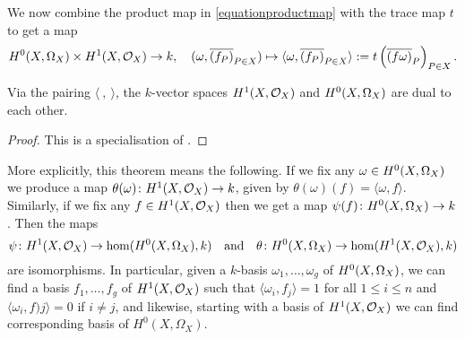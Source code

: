 We now combine the product map in \eqref{equationproductmap} with the trace map $t$ to get a map 
    \[
    {H^0(X,\Omega_X)} \times H^1(X,\mathcal{O}_X) \rightarrow k,\quad (\omega, \overline{(f_P)}_{P \in X}) \mapsto \langle \omega, \overline{(f_P)}_{P \in X} \rangle := t \left( \overline{(f \omega)}_P \right)_{P \in X}.
    \]

    \begin{thm}\label{theoremserreduality}
    Via the pairing $\langle\ ,\ \rangle$, the $k$-vector spaces $H^1(X,\mathcal{O}_X)$ and ${H^0(X,\Omega_X)}$ are dual to each other.
    \end{thm}
    \begin{proof}
    This is a specialisation of \cite[Chap.\ II, Thm.\ 2]{algebraicgroupsandclassfields}.
    \end{proof}

More explicitly, this theorem means the following.
If we fix any $\omega \in {H^0(X,\Omega_X)}$ we produce a map $\theta(\omega)\colon H^1(X,\mathcal{O}_X) \rightarrow k$, given by $\theta(\omega)(f) = \langle \omega , f\rangle$.
Similarly, if we fix any $f \in H^1(X,\mathcal{O}_X)$ then we get a map $\psi(f) \colon {H^0(X,\Omega_X)} \rightarrow k$.
Then the maps 
    \[
    \psi \colon H^1(X,\mathcal{O}_X) \rightarrow \hom(H^0(X,\Omega_X),k) \quad
    \text{and} \quad    
    \theta \colon H^0(X,\Omega_X) \rightarrow \hom(H^1(X,\mathcal{O}_X), k)
    \]
are isomorphisms.
In particular, given a $k$-basis $\omega_1, \ldots, \omega_g$ of ${H^0(X,\Omega_X)}$, we can find a basis $f_1, \ldots , f_g$ of $H^1(X,\mathcal{O}_X)$ such that $\langle \omega_i, f_j \rangle = 1$ for all $1 \leq i \leq n$ and $\langle \omega_i, f)j \rangle = 0$ if $i \neq j$, and likewise, starting with a basis of $H^1(X,\mathcal{O}_X)$ we can find corresponding basis of $H^0(X,\Omega_X)$. 





















